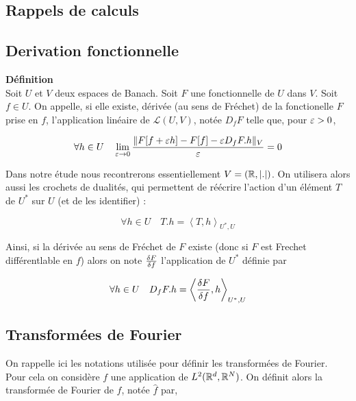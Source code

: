 \documentclass[10pt]{article}
\begin{document}
\begin{multicols}{2}
\section{Rappels de calculs}

\subsection{Derivation fonctionnelle}


\textbf{Définition}\\
Soit $U$ et $V$ deux espaces de Banach. Soit $F$ une fonctionnelle de $U$ dans $V$. 
Soit $f \in U$. On appelle, si elle existe, dérivée (au sens de Fréchet) de la fonctionelle $F$ prise en $f$, l'application linéaire de $\mathcal{L}(U,V)$, notée $D_fF$ telle que, pour $\varepsilon>0$, 

\begin{equation}
\forall h \in U \quad \lim_{ \varepsilon \rightarrow 0 } \frac{\| F[f+\varepsilon h] - F[f] - \varepsilon D_fF.h\|_V}{\varepsilon}  = 0
\end{equation} 


Dans notre étude nous recontrerons essentiellement $V = (\mathbb{R}, |.|)$. On utilisera alors aussi les crochets de dualités, qui permettent de réécrire l'action d'un élément $T$ de $U^*$ sur $U$ (et de les identifier) : 

\begin{equation}
  \forall h \in U \quad T.h = \left< T, h \right>_{U^*, U}
\end{equation}

Ainsi, si la dérivée au sens de Fréchet de $F$ existe (donc si $F$ est Frechet différentlable en $f$) alors on note $\frac{\delta F}{\delta f}$ l'application de $U^*$ définie par 

\begin{equation}
  \forall h \in U \quad D_fF.h = \left< \frac{\delta F}{\delta f}, h \right>_{U^*, U}
\end{equation}

\vspace*{11pt}



\subsection{Transformées de Fourier}

On rappelle ici les notations utilisée pour définir les transformées de Fourier. Pour cela on considère $f$ une application de $L^2(\mathbb{R}^d, \mathbb{R}^N)$. On définit alors la transformée de Fourier de $f$, notée $\hat{f}$ par, 


\end{multicols}
\end{document}
